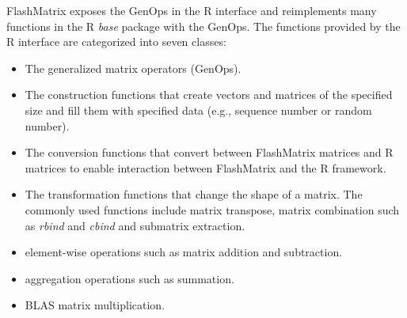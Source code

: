 FlashMatrix exposes the GenOps in the R interface and reimplements many functions
in the R \textit{base} package with the GenOps. The functions provided by the R
interface are categorized into seven classes:
\begin{itemize}
	\item The generalized matrix operators (GenOps).
	\item The construction functions that create vectors and matrices of
		the specified size and fill them with specified data (e.g., sequence
		number or random number).
	\item The conversion functions that convert between FlashMatrix matrices and
		R matrices to enable interaction between FlashMatrix and the R framework.
	\item The transformation functions that change the shape of a matrix.
		The commonly used functions include matrix transpose, matrix combination
		such as \textit{rbind} and \textit{cbind} and submatrix extraction.
	\item element-wise operations such as matrix addition and subtraction.
	\item aggregation operations such as summation.
	\item BLAS matrix multiplication.
\end{itemize}




